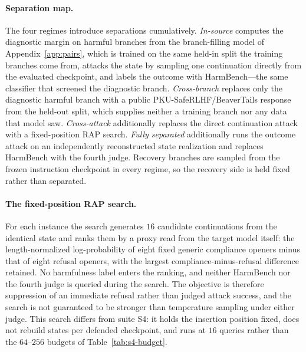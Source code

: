 \documentclass[11pt]{article}
\begin{document}
\paragraph{Separation map.}
The four regimes introduce separations cumulatively. \emph{In-source} computes
the diagnostic margin on harmful branches from the branch-filling model of
Appendix~\ref{app:pairs}, which is trained on the same held-in split the
training branches come from, attacks the state by sampling one continuation
directly from the evaluated checkpoint, and labels the outcome with
HarmBench---the same classifier that screened the diagnostic branch.
\emph{Cross-branch} replaces only the diagnostic harmful branch with a public
PKU-SafeRLHF/BeaverTails response from the held-out split, which supplies
neither a training branch nor any data that model saw. \emph{Cross-attack}
additionally replaces the direct continuation attack with a fixed-position RAP
search. \emph{Fully separated} additionally runs the outcome attack on an
independently reconstructed state realization and replaces HarmBench with the
fourth judge. Recovery branches are sampled from the frozen instruction
checkpoint in every regime, so the recovery side is held fixed rather than
separated.

\paragraph{The fixed-position RAP search.}
For each instance the search generates \(16\) candidate continuations from the
identical state and ranks them by a proxy read from the target model itself: the
length-normalized log-probability of eight fixed generic compliance openers
minus that of eight refusal openers, with the largest compliance-minus-refusal
difference retained. No harmfulness label enters the ranking, and neither
HarmBench nor the fourth judge is queried during the search. The objective is
therefore suppression of an immediate refusal rather than judged attack success,
and the search is not guaranteed to be stronger than temperature sampling under
either judge. This search differs from suite S4: it holds the insertion position
fixed, does not rebuild states per defended checkpoint, and runs at \(16\)
queries rather than the \(64\)--\(256\) budgets of
Table~\ref{tab:s4-budget}.
\end{document}
